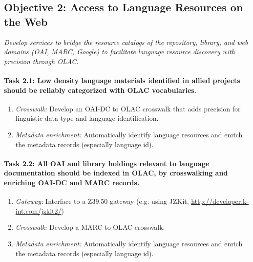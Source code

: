 \subsection*{Objective 2: Access to Language Resources on the Web}

\emph{Develop services to bridge the resource catalogs of the
  repository, library, and web domains (OAI, MARC, Google)
  to facilitate language resource discovery with precision through OLAC.}

\def\task{2.1}
\paragraph{Task {\task}: Low density language materials identified in allied projects
      should be reliably categorized with OLAC vocabularies.}

\begin{enumerate}[label=\emph{\task\alph*}]
\item \emph{Crosswalk:}
  Develop an OAI-DC to OLAC crosswalk that adds precision for linguistic data
  type and language identification.
\item \emph{Metadata enrichment:}
  Automatically identify language resources and
  enrich the metadata records (especially language id).
\end{enumerate}

\def\task{2.2}
\paragraph{Task {\task}: All OAI and library holdings relevant to language
      documentation should be indexed in OLAC, by
      crosswalking and enriching OAI-DC and MARC records.}

\begin{enumerate}[label=\emph{\task\alph*}]
\item \emph{Gateway:}
  Interface to a Z39.50 gateway (e.g. using JZKit,
  \url{http://developer.k-int.com/jzkit2/})
\item \emph{Crosswalk:}
  Develop a MARC to OLAC crosswalk.
\item \emph{Metadata enrichment:}
  Automatically identify language resources and
  enrich the metadata records (especially language id).
\end{enumerate}



